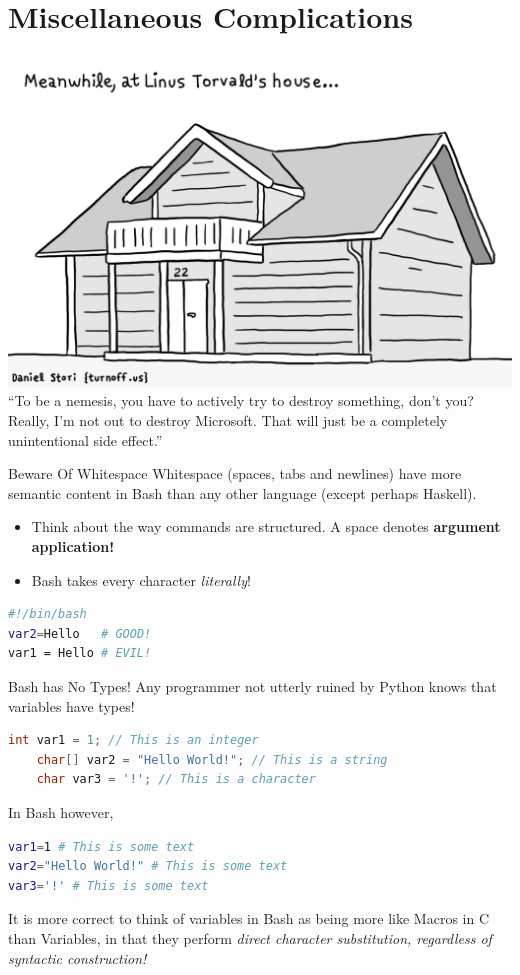 \documentclass[11pt]{beamer}
\begin{document}
\section[Miscellany]{Miscellaneous Complications}
\begin{frame}
\center
\includegraphics[scale=0.2]{linus-torvalds-house.png} \\
``To be a nemesis, you have to actively try to destroy something, don't you? Really, I'm not out to destroy Microsoft. That will just be a completely unintentional side effect.'' 
\end{frame}

\begin{frame}[fragile=singleslide]{Beware Of Whitespace}
Whitespace (spaces, tabs and newlines) have more semantic content in Bash than any other language (except perhaps Haskell).
\begin{itemize}
\item Think about the way commands are structured.  A space denotes \textbf{argument application!}
\item Bash takes every character \emph{literally}! 
\end{itemize}
\begin{lstlisting}[style=terminal, language=bash]
#!/bin/bash
var2=Hello   # GOOD! 
var1 = Hello # EVIL!
\end{lstlisting}
\end{frame}

\begin{frame}[fragile=singleslide]{Bash has No Types!}
Any programmer not utterly ruined by Python knows that variables have types! 
\begin{lstlisting}[style=C, language=C]
	int var1 = 1; // This is an integer
	char[] var2 = "Hello World!"; // This is a string
	char var3 = '!'; // This is a character
\end{lstlisting}
In Bash however,
\begin{lstlisting}[style=terminal, language=bash]
var1=1 # This is some text
var2="Hello World!" # This is some text
var3='!' # This is some text
\end{lstlisting}
It is more correct to think of variables in Bash as being more like Macros in C than Variables, in that they perform \emph{direct character substitution, regardless of syntactic construction!}
\end{frame}
\end{document}
